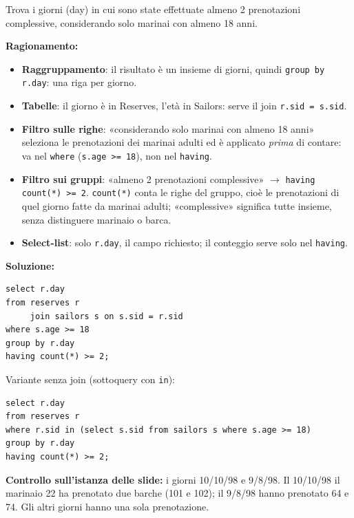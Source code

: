 \documentclass[12pt, a4paper]{article}
\begin{document}
\begin{tcolorbox}[colback=lightergray!10, colframe=tocsec, title=\textbf{Esercizio SQL 2}]
Trova i giorni (day) in cui sono state effettuate almeno 2 prenotazioni complessive, considerando solo marinai con almeno 18 anni.
\end{tcolorbox}

\textbf{Ragionamento:}
\begin{itemize}
\item \textbf{Raggruppamento}: il risultato è un insieme di giorni, quindi \texttt{group by r.day}: una riga per giorno.
\item \textbf{Tabelle}: il giorno è in Reserves, l'età in Sailors: serve il join \mbox{\texttt{r.sid = s.sid}}.
\item \textbf{Filtro sulle righe}: «considerando solo marinai con almeno 18 anni» seleziona le prenotazioni dei marinai adulti ed è applicato \emph{prima} di contare: va nel \texttt{where} (\mbox{\texttt{s.age >= 18}}), non nel \texttt{having}.
\item \textbf{Filtro sui gruppi}: «almeno 2 prenotazioni complessive» $\to$ \texttt{having count(*) >= 2}. \texttt{count(*)} conta le righe del gruppo, cioè le prenotazioni di quel giorno fatte da marinai adulti; «complessive» significa tutte insieme, senza distinguere marinaio o barca.
\item \textbf{Select-list}: solo \texttt{r.day}, il campo richiesto; il conteggio serve solo nel \texttt{having}.
\end{itemize}

\textbf{Soluzione:}
\begin{verbatim}
select r.day
from reserves r
     join sailors s on s.sid = r.sid
where s.age >= 18
group by r.day
having count(*) >= 2;
\end{verbatim}
Variante senza join (sottoquery con \texttt{in}):
\begin{verbatim}
select r.day
from reserves r
where r.sid in (select s.sid from sailors s where s.age >= 18)
group by r.day
having count(*) >= 2;
\end{verbatim}
\textbf{Controllo sull'istanza delle slide:} i giorni 10/10/98 e 9/8/98. Il 10/10/98 il marinaio 22 ha prenotato due barche (101 e 102); il 9/8/98 hanno prenotato 64 e 74. Gli altri giorni hanno una sola prenotazione.
\end{document}
